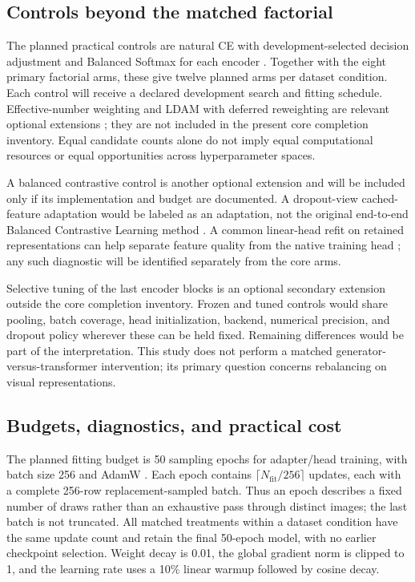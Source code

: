 \documentclass[conference]{IEEEtran}
\begin{document}
\subsection{Controls beyond the matched factorial}
The planned practical controls are natural CE with development-selected decision adjustment and Balanced Softmax for each encoder \cite{menon2021logit,ren2020balanced}. Together with the eight primary factorial arms, these give twelve planned arms per dataset condition. Each control will receive a declared development search and fitting schedule. Effective-number weighting and LDAM with deferred reweighting are relevant optional extensions \cite{cui2019classbalanced,cao2019ldam}; they are not included in the present core completion inventory. Equal candidate counts alone do not imply equal computational resources or equal opportunities across hyperparameter spaces.

A balanced contrastive control is another optional extension and will be included only if its implementation and budget are documented. A dropout-view cached-feature adaptation would be labeled as an adaptation, not the original end-to-end Balanced Contrastive Learning method \cite{zhu2022balanced}. A common linear-head refit on retained representations can help separate feature quality from the native training head \cite{kang2020decoupling}; any such diagnostic will be identified separately from the core arms.

Selective tuning of the last encoder blocks is an optional secondary extension outside the core completion inventory. Frozen and tuned controls would share pooling, batch coverage, head initialization, backend, numerical precision, and dropout policy wherever these can be held fixed. Remaining differences would be part of the interpretation. This study does not perform a matched generator-versus-transformer intervention; its primary question concerns rebalancing on visual representations.

\subsection{Budgets, diagnostics, and practical cost}
The planned fitting budget is 50 sampling epochs for adapter/head training, with batch size 256 and AdamW \cite{loshchilov2019adamw}. Each epoch contains $\lceil N_{\mathrm{fit}}/256\rceil$ updates, each with a complete 256-row replacement-sampled batch. Thus an epoch describes a fixed number of draws rather than an exhaustive pass through distinct images; the last batch is not truncated. All matched treatments within a dataset condition have the same update count and retain the final 50-epoch model, with no earlier checkpoint selection. Weight decay is 0.01, the global gradient norm is clipped to 1, and the learning rate uses a 10\% linear warmup followed by cosine decay.
\end{document}
